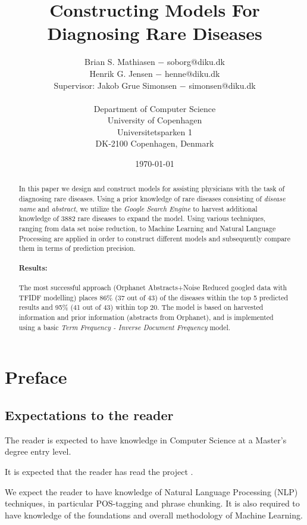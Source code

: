 \documentclass[10pt,letterpaper,two column,final]{article}
\title{Constructing Models For Diagnosing Rare Diseases}
\author{Brian S. Mathiasen $-$ soborg@diku.dk \\
        Henrik G. Jensen $-$ henne@diku.dk\\
        \small{Supervisor: Jakob Grue Simonsen $-$ simonsen@diku.dk} \\
        \\
        Department of Computer Science\\
        University of Copenhagen\\
        Universitetsparken 1\\
        DK-2100 Copenhagen, Denmark
}
\date{\today} %
\begin{document}
\maketitle


\begin{abstract}
In this paper we design and construct models for assisting physicians
with the task of diagnosing rare diseases. Using a prior knowledge of
rare diseases consisting of \textit{disease name} and \textit{abstract},
we utilize the \textit{Google Search Engine} to harvest additional
knowledge of 3882 rare diseases to expand the model. Using various
techniques, ranging from data set noise reduction, to Machine
Learning and Natural Language Processing are applied in order to
construct different models and subsequently compare them in terms of
prediction precision.

\paragraph{Results: }The most successful approach (Orphanet Abstracts+Noise Reduced googled
data with TFIDF modelling) places 86\% (37 out of 43) of the diseases
within the top 5 predicted results and 95\% (41 out of 43) within top
20. The model is based on harvested information and prior information
(abstracts from Orphanet), and is implemented using a basic \textit{Term
Frequency - Inverse Document Frequency} model.
\end{abstract}

\section{Preface}
\subsection{Expectations to the reader}
The reader is expected to have knowledge in Computer Science at a
Master's degree entry level.

It is expected that the reader has read the project
\cite{jensenandersen}.

We expect the reader to have knowledge of Natural Language Processing (NLP)
techniques, in particular POS-tagging and phrase chunking. It is also
required to have knowledge of the foundations and overall methodology of
Machine Learning.
\end{document}
